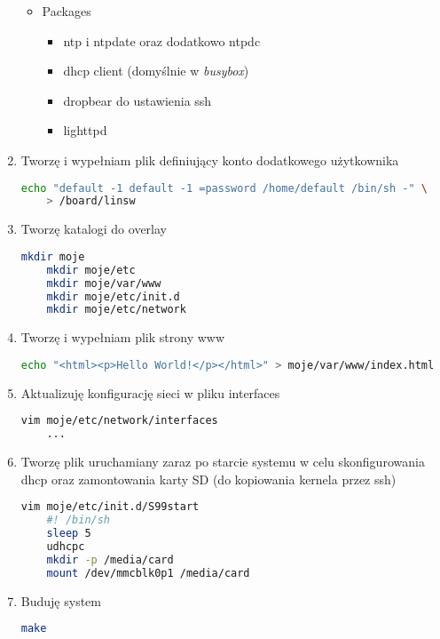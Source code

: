 \begin{enumerate}
\begin{itemize}
		\item Packages 
		\begin{itemize}
			\item ntp i ntpdate oraz dodatkowo ntpdc
			\item dhcp client (domyślnie w \emph{busybox})
			\item dropbear do ustawienia ssh
			\item lighttpd
		\end{itemize}
	\end{itemize}
	
	\item Tworzę i wypełniam plik definiujący konto dodatkowego użytkownika
	\begin{lstlisting}[language=bash]
	echo "default -1 default -1 =password /home/default /bin/sh -" \
	> /board/linsw
	\end{lstlisting}	
		
	\item Tworzę katalogi do overlay
	\begin{lstlisting}[language=bash]
	mkdir moje
	mkdir moje/etc
	mkdir moje/var/www
	mkdir moje/etc/init.d
	mkdir moje/etc/network
	\end{lstlisting}	
	
	\item Tworzę i wypełniam plik strony www
	\begin{lstlisting}[language=bash]
echo "<html><p>Hello World!</p></html>" > moje/var/www/index.html 
	\end{lstlisting}
		
	\item Aktualizuję konfigurację sieci w pliku interfaces
	\begin{lstlisting}[language=bash]
	vim moje/etc/network/interfaces
	...
	\end{lstlisting}
		
	\item Tworzę plik uruchamiany zaraz po starcie systemu w celu skonfigurowania dhcp oraz zamontowania karty SD (do kopiowania kernela przez ssh)
	\begin{lstlisting}[language=bash]
	vim moje/etc/init.d/S99start
	#! /bin/sh
	sleep 5
	udhcpc
	mkdir -p /media/card
	mount /dev/mmcblk0p1 /media/card
	\end{lstlisting}
		
	\item Buduję system
	\begin{lstlisting}[language=bash]
	make
	\end{lstlisting}		
\end{enumerate}

